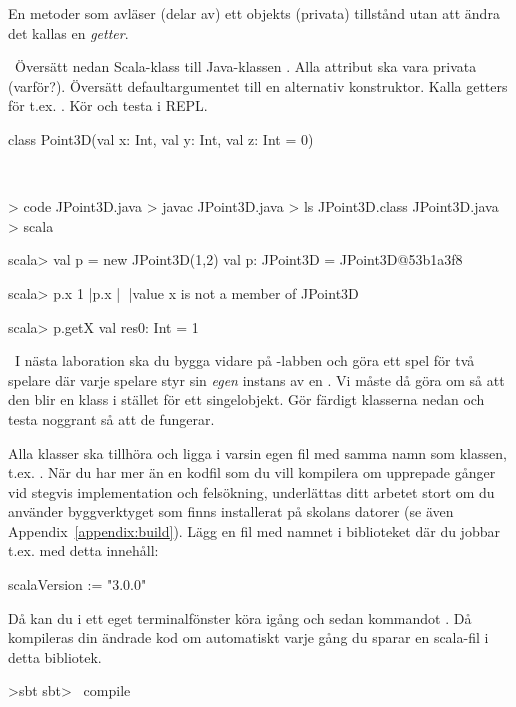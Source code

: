 \SubtaskSolved En metoder som avläser (delar av) ett objekts (privata) tillstånd utan att ändra det kallas en \emph{getter}.

\QUESTEND



\QUESTBEGIN

\Task \what~Översätt nedan Scala-klass till Java-klassen . Alla attribut ska vara privata (varför?). Översätt defaultargumentet till en alternativ konstruktor. Kalla getters för t.ex. . Kör  och testa i REPL.

\begin{Code}
class Point3D(val x: Int, val y: Int, val z: Int = 0)
\end{Code}

\SOLUTION

\TaskSolved \what~


\begin{REPL}
> code JPoint3D.java
> javac JPoint3D.java
> ls
JPoint3D.class  JPoint3D.java
> scala

scala> val p = new JPoint3D(1,2)
val p: JPoint3D = JPoint3D@53b1a3f8

scala> p.x
1 |p.x
  |^^^
  |value x is not a member of JPoint3D

scala> p.getX
val res0: Int = 1
\end{REPL}

\QUESTEND



\QUESTBEGIN

\Task\label{exe:classes:labprep}  \what~I nästa laboration ska du bygga vidare på -labben och göra ett spel för två spelare där varje spelare styr sin \emph{egen} instans av en . Vi måste då göra om  så att den blir en klass i stället för ett singelobjekt. Gör färdigt klasserna nedan och testa noggrant så att de fungerar. 

Alla klasser ska tillhöra  och ligga i varsin egen fil med samma namn som klassen, t.ex. . När du har mer än en kodfil som du vill kompilera om upprepade gånger vid stegvis implementation och felsökning, underlättas ditt arbetet stort om du använder byggverktyget  som finns installerat på skolans datorer (se även Appendix~\ref{appendix:build}). Lägg en fil med namnet  i biblioteket där du jobbar t.ex.  med detta innehåll:
\begin{Code}
scalaVersion := "3.0.0"
\end{Code}
Då kan du i ett eget terminalfönster köra igång  och sedan kommandot . Då kompileras din ändrade kod om automatiskt varje gång du sparar en scala-fil i detta bibliotek.
\begin{REPLnonum}
>sbt
sbt> ~compile
\end{REPLnonum}

